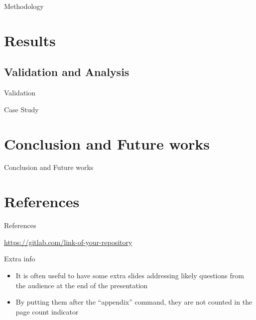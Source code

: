 \documentclass[
  xcolor={hyperref,svgnames,x11names,table},
  hyperref={pdfencoding=unicode,plainpages=false,pdfpagelabels=true,breaklinks=true},
  brazilian,english,12pt,aspectratio=149,
]{beamer}
\begin{document}
\begin{frame}{Methodology}
\end{frame}

\section{Results}

\subsection{Validation and Analysis}

\begin{frame}{Validation}
\end{frame}

\begin{frame}{Case Study}
\end{frame}

\section{Conclusion and Future works}

\begin{frame}{Conclusion and Future works}
\end{frame}

\section{References}

\begin{frame}[allowframebreaks]{References}
  \nocite{bronevetsky02, schmidt03:MSc, FSF:GNU-GPL, CORBA:spec,
          MenaChalco08, natbib, biblatex, eco:09}
  \printbibliography
\end{frame}

\begin{frame}[t]{\insertshorttitle}
  \overview

  \vspace{1\baselineskip}
  \bgroup
  \centering
    \url{https://gitlab.com/link-of-your-repository}\par
  \egroup

\end{frame}

\showqrcode

\appendix

\begin{frame}{Extra info}
  \begin{itemize}
    \item It is often useful to have some extra slides addressing likely questions from the audience at the end of the presentation
    \item By putting them after the ``appendix'' command, they are not counted in the page count indicator
  \end{itemize}
\end{frame}
\end{document}
